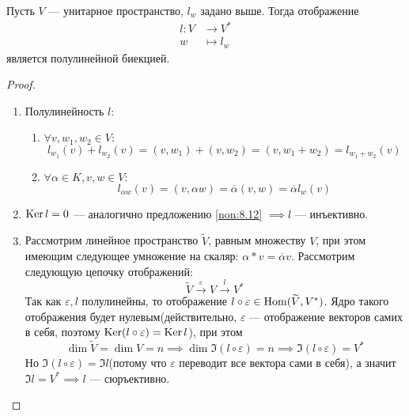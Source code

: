 \documentclass[../main.tex]{subfiles}
\begin{document}
\begin{theorem-non}
\label{non:8.13}
  Пусть $V$ --- унитарное пространство, $l_w$ задано выше. Тогда отображение
  \begin{align*}
    l\colon V &\to V^{*} \\
            w &\mapsto l_w
  \end{align*}
  является полулинейной биекцией.
\end{theorem-non}
\begin{proof}
  \begin{enumerate}
    \item Полулинейность $l$:
    \begin{enumerate}
      \item $\forall v, w_1, w_2 \in V\colon$
      \begin{equation*}
        l_{w_1}(v) + l_{w_2}(v) = (v, w_1) + (v, w_2) = (v, w_1 + w_2) = l_{w_1 + w_2}(v)
      \end{equation*}

      \item $\forall \alpha \in K, v, w \in V\colon$
      \begin{equation*}
        l_{\alpha w}(v) = (v, \alpha w) = \overline{\alpha} (v, w) = \overline{\alpha} l_w(v)
      \end{equation*}
    \end{enumerate}
    \item $\operatorname{Ker} l = 0$ --- аналогично предложению \ref{non:8.12} $\implies l$ --- инъективно.
    \item Рассмотрим линейное пространство $\widetilde{V}$, равным множеству $V$, при этом имеющим следующее умножение на скаляр: $\alpha * v = \overline{\alpha} v$. Рассмотрим следующую цепочку отображений:
    \begin{equation*}
      \widetilde{V} \overset{\varepsilon}{\longrightarrow} V \overset{l}{\longrightarrow} V^{*}
    \end{equation*}
    Так как $\varepsilon, l$ полулинейны, то отображение $l \circ \varepsilon \in \operatorname{Hom}(\widetilde{V}, V^{*})$. Ядро такого отображения будет нулевым(действительно, $\varepsilon$ --- отображение векторов самих в себя, поэтому $\operatorname{Ker} (l \circ \varepsilon) = \operatorname{Ker} l$), при этом
    \begin{equation*}
      \dim \widetilde{V} = \dim V = n \implies \dim \Im (l \circ \varepsilon) = n \implies \Im (l \circ \varepsilon) = V^{*}
    \end{equation*}
    Но $\Im (l \circ \varepsilon) = \Im l$(потому что $\varepsilon$ переводит все вектора сами в себя), а значит $\Im l = V^{*} \implies l$ --- сюръективно.
  \end{enumerate}
\end{proof}
\end{document}
